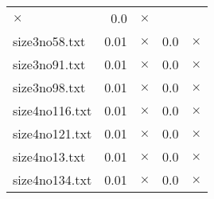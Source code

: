 \documentclass{article}
\begin{document}
\begin{center}
\begin{tabular}{lrrrr}
$\times$
 & 0.0 & 
$\times$
\\
size3no58.txt & 0.01 & 
$\times$
 & 0.0 & 
$\times$
\\
size3no91.txt & 0.01 & 
$\times$
 & 0.0 & 
$\times$
\\
size3no98.txt & 0.01 & 
$\times$
 & 0.0 & 
$\times$
\\
size4no116.txt & 0.01 & 
$\times$
 & 0.0 & 
$\times$
\\
size4no121.txt & 0.01 & 
$\times$
 & 0.0 & 
$\times$
\\
size4no13.txt & 0.01 & 
$\times$
 & 0.0 & 
$\times$
\\
size4no134.txt & 0.01 & 
$\times$
 & 0.0 & 
$\times$
\\
\hline\end{tabular}
\end{center}
\end{document}
